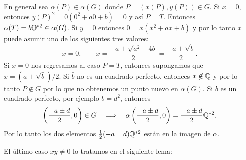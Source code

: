 En general sea $\alpha(P)\in\alpha(G)$ donde $P=(x(P),y(P))\in G$. Si $x=0$, entonces $y(P)^2=0(0^2+a0+b)=0$ y así $P=T$. Entonces $\alpha(T)=b\mathbb{Q}^{*2}\in\alpha(G)$. Si $y=0$ entonces $0=x(x^2+ax+b)$ y por lo tanto $x$ puede asumir uno de los siguientes tres valores:
\[
	x=0,\qquad x=\frac{-a\pm\sqrt{a^2-4b}}{2}=\frac{-a\pm\sqrt{\bar{b}}}{2}.
\]
Si $x=0$ nos regresamos al caso $P=T$, entonces supongamos que $x=(a\pm\sqrt{\bar{b}})/2$. Si $\bar{b}$ no es un cuadrado perfecto, entonces $x\not\in\mathbb{Q}$ y por lo tanto $P\not\in G$ por lo que no obtenemos un punto nuevo en $\alpha(G)$. Si $\bar{b}$ es un cuadrado perfecto, por ejemplo $\bar{b}=d^2$, entonces
\[
	\left( \frac{-a\pm d}{2},0 \right)\in G\quad\Longrightarrow\quad \alpha\left( \frac{-a\pm d}{2},0 \right)=\frac{-a\pm d}{2}\mathbb{Q}^{*2}.
\]
Por lo tanto los dos elementos $\tfrac{1}{2}(-a\pm d)\mathbb{Q}^{*2}$ están en la imagen de $\alpha$.

El último caso $xy\neq0$ lo tratamos en el siguiente lema:

